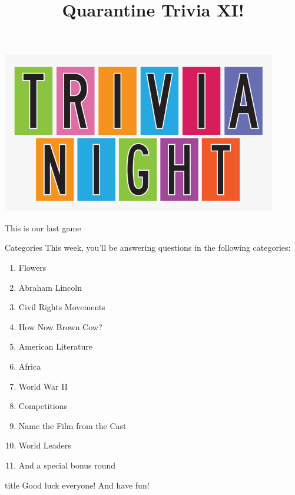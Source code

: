 \documentclass[11pt]{beamer}
\begin{document}
\title{Quarantine Trivia XI!}
\date{}

\begin{frame}
\titlepage{}
\begin{center}
\includegraphics[max width=0.9\textwidth,
    max height=0.4\textheight]{Images/triviatitleframelogo.png}
\end{center}
\end{frame}

\begingroup{}
\begin{frame}{}
This is our last game
\end{frame}


\begingroup{}
\begin{frame}[t]{Categories}
This week, you'll be answering questions in the following categories:
\begin{enumerate}
\item Flowers
\item Abraham Lincoln
\item Civil Rights Movements
\item How Now Brown Cow?
\item American Literature
\item Africa
\item World War II
\item Competitions
\item Name the Film from the Cast
\item World Leaders
\item And a special bonus round
\end{enumerate}
\end{frame}
\endgroup{}

\begingroup{}
\begin{frame}
\vfill{}
\begin{beamercolorbox}[sep=8pt,center,shadow=true,rounded=true]{title}
Good luck everyone! And have fun!
\end{beamercolorbox}
\vfill{}
\end{frame}
\endgroup{}
\def\thisSectionName{Flowers}
\end{document}
